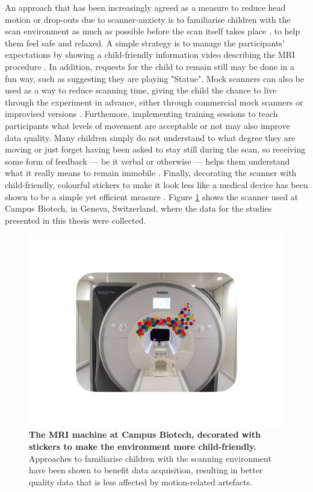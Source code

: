 An approach that has been increasingly agreed as a measure to reduce head motion or drop-outs due to scanner-anxiety is to familiarise children with the scan environment as much as possible before the scan itself takes place \citep{Greene2016}, to help them feel safe and relaxed. A simple strategy is to manage the participants' expectations by showing a child-friendly information video describing the MRI procedure \citep{Thomason2009}. In addition, requests for the child to remain still may be done in a fun way, such as suggesting they are playing "Statue". Mock scanners can also be used as a way to reduce scanning time, giving the child the chance to live through the experiment in advance, either through commercial mock scanners or improvised versions \citep{DeBie2010,Barnea-Goraly2014}. Furthemore, implementing training sessions to teach participants what levels of movement are acceptable or not may also improve data quality. Many children simply do not understand to what degree they are moving or just forget having been asked to stay still during the scan, so receiving some form of feedback --- be it verbal or otherwise --- helps them understand what it really means to remain immobile \citep{DeBie2010}. Finally, decorating the scanner with child-friendly, colourful stickers to make it look less like a medical device has been shown to be a simple yet efficient measure \citep{Nordahl2016}. Figure \ref{fig:MRI} shows the scanner used at Campus Biotech, in Geneva, Switzerland, where the data for the studies presented in this thesis were collected.



\begin{figure}[h!]
\centering\includegraphics[width=1\linewidth]{images/Ch2/Ch2_MRI.pdf}
\caption{\textbf{The MRI machine at Campus Biotech, decorated with stickers to make the environment more child-friendly.} Approaches to familiarise children with the scanning environment have been shown to benefit data acquisition, resulting in better quality data that is less affected by motion-related artefacts.} \label{fig:MRI}
\end{figure}




